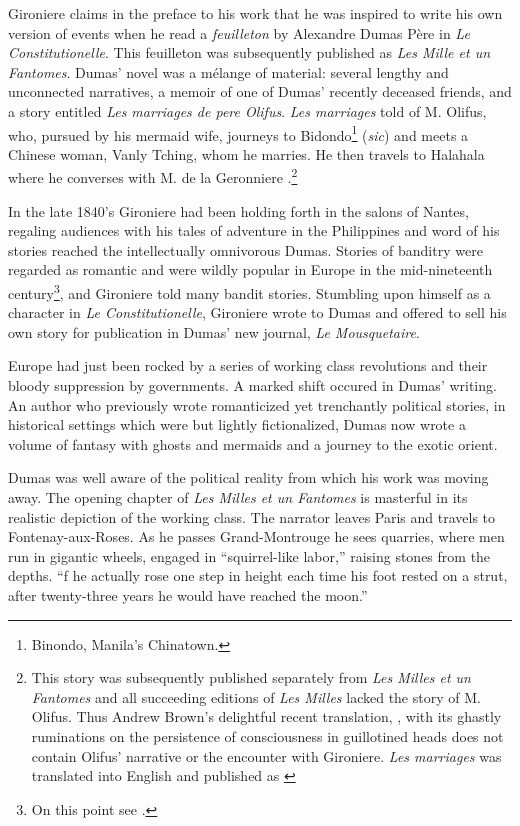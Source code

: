Gironiere claims in the preface to his work that he was inspired to write his own version of events when he read a \textit{feuilleton} by Alexandre Dumas P\`ere in \textit{Le Constitutionelle}. This feuilleton was subsequently published as \textit{Les Mille et un Fantomes}. Dumas' novel was a m\'elange of material: several lengthy and unconnected narratives, a memoir of one of Dumas' recently deceased friends, and a story entitled \textit{Les marriages de pere Olifus}. \textit{Les marriages} told of M. Olifus, who, pursued by his mermaid wife, journeys to Bidondo\footnote{Binondo, Manila's Chinatown.} (\textit{sic}) and meets a Chinese woman, Vanly Tching, whom he marries. He then travels to Halahala  where he converses with M. de la Geronniere .\footnote{This story was subsequently published separately from \textit{Les Milles et un Fantomes} and all succeeding editions of \textit{Les Milles} lacked the story of M. Olifus. Thus Andrew Brown's delightful recent translation, \cite{Dumas2004}, with its ghastly ruminations on the persistence of consciousness in guillotined heads does not contain Olifus' narrative or the encounter with Gironiere. \textit{Les marriages} was translated into English and published as \cite{Dumas}}

In the late 1840's Gironiere had been holding forth in the salons of Nantes, regaling audiences with his tales of adventure in the Philippines and word of his stories reached the intellectually omnivorous Dumas. Stories of banditry were regarded as romantic and were wildly popular in Europe in the mid-nineteenth century\footnote{On this point see \cite{Hobsbawm2000}.}, and Gironiere told many bandit stories. Stumbling upon himself as a character in \textit{Le Constitutionelle}, Gironiere wrote to Dumas and offered to sell his own story for publication in Dumas' new journal, \textit{Le Mousquetaire}.

Europe had just been rocked by a series of working class revolutions and their bloody suppression by governments. A marked shift occured in Dumas' writing. An author who previously wrote romanticized yet trenchantly political stories, in historical settings which were but lightly fictionalized, Dumas now wrote a volume of fantasy with ghosts and mermaids and a journey to the exotic orient.

Dumas was well aware of the political reality from which his work was moving away. The opening chapter of \textit{Les Milles et un Fantomes} is masterful in its realistic depiction of the working class. The narrator leaves Paris and travels to Fontenay-aux-Roses. As he passes Grand-Montrouge he sees quarries, where men run in gigantic wheels, engaged in \enquote{squirrel-like labor,} raising stones from the depths. \enquote{f he actually rose one step in height each time his foot rested on a strut, after twenty-three years he would have reached the moon.}

